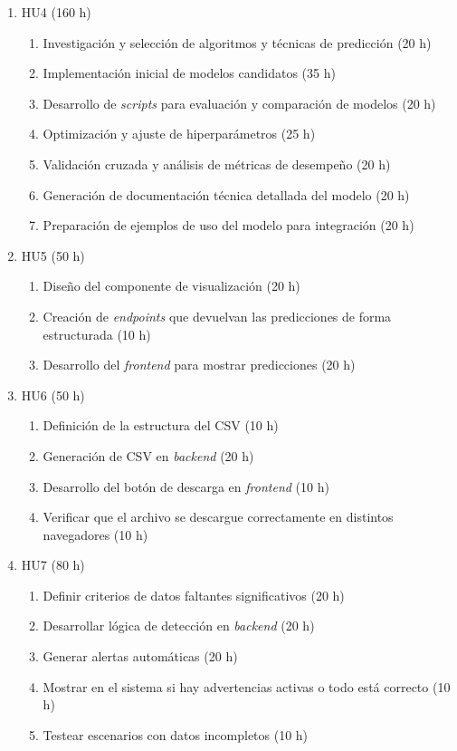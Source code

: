 \documentclass[
11pt, %
]{charter}
\begin{document}
\begin{enumerate}
\item HU4 (160 h)
\begin{enumerate}
	\item Investigación y selección de algoritmos y técnicas de predicción (20 h)
	\item Implementación inicial de modelos candidatos (35 h)
	\item Desarrollo de \textit{scripts} para evaluación y comparación de modelos (20 h)
	\item Optimización y ajuste de hiperparámetros (25 h)
	\item Validación cruzada y análisis de métricas de desempeño (20 h)
	\item Generación de documentación técnica detallada del modelo (20 h)
	\item Preparación de ejemplos de uso del modelo para integración (20 h)
\end{enumerate}


\item HU5 (50 h)
\begin{enumerate}
	\item Diseño del componente de visualización (20 h)
	\item Creación de \textit{endpoints} que devuelvan las predicciones de forma estructurada (10 h)
	\item Desarrollo del \textit{frontend} para mostrar predicciones (20 h)
\end{enumerate}


\item HU6 (50 h)
\begin{enumerate}
	\item Definición de la  estructura del CSV (10 h)
	\item Generación de CSV en \textit{backend} (20 h)
	\item Desarrollo del botón de descarga en \textit{frontend} (10 h)
	\item Verificar que el archivo se descargue correctamente en distintos navegadores (10 h)
\end{enumerate}


\item HU7 (80 h)
\begin{enumerate}
	\item Definir criterios de datos faltantes significativos (20 h)
	\item Desarrollar lógica de detección en \textit{backend} (20 h)
	\item Generar alertas automáticas (20 h)
	\item Mostrar en el sistema si hay advertencias activas o todo está correcto (10 h)
	\item Testear escenarios con datos incompletos (10 h)
\end{enumerate}



\end{enumerate}
\end{document}
